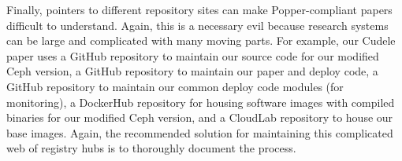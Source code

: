 Finally, pointers to different repository sites can make Popper-compliant
papers difficult to understand. Again, this is a necessary evil because
research systems can be large and complicated with many moving parts. For
example, our Cudele paper uses a GitHub repository to maintain our source code
for our modified Ceph version, a GitHub repository to maintain our paper and
deploy code, a GitHub repository to maintain our common deploy code modules
(for monitoring), a DockerHub repository for housing software images with
compiled binaries for our modified Ceph version, and a CloudLab repository to
house our base images. Again, the recommended solution for maintaining this
complicated web of registry hubs is to thoroughly document the process.



